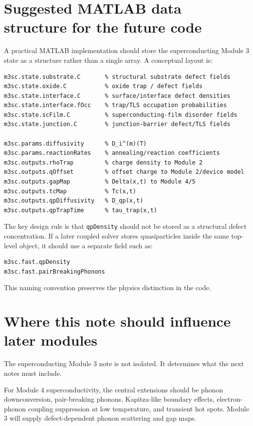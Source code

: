 \documentclass[11pt]{article}
\begin{document}
\section{Suggested MATLAB data structure for the future code}

A practical MATLAB implementation should store the superconducting Module 3 state as a structure rather than a single array. A conceptual layout is:
\begin{verbatim}
m3sc.state.substrate.C       % structural substrate defect fields
m3sc.state.oxide.C           % oxide trap / defect fields
m3sc.state.interface.C       % surface/interface defect densities
m3sc.state.interface.fOcc    % trap/TLS occupation probabilities
m3sc.state.scFilm.C          % superconducting-film disorder fields
m3sc.state.junction.C        % junction-barrier defect/TLS fields

m3sc.params.diffusivity      % D_i^(m)(T)
m3sc.params.reactionRates    % annealing/reaction coefficients
m3sc.outputs.rhoTrap         % charge density to Module 2
m3sc.outputs.qOffset         % offset charge to Module 2/device model
m3sc.outputs.gapMap          % Delta(x,t) to Module 4/5
m3sc.outputs.tcMap           % Tc(x,t)
m3sc.outputs.qpDiffusivity   % D_qp(x,t)
m3sc.outputs.qpTrapTime      % tau_trap(x,t)
\end{verbatim}
The key design rule is that \texttt{qpDensity} should not be stored as a structural defect concentration. If a later coupled solver stores quasiparticles inside the same top-level object, it should use a separate field such as:
\begin{verbatim}
m3sc.fast.qpDensity
m3sc.fast.pairBreakingPhonons
\end{verbatim}
This naming convention preserves the physics distinction in the code.

\section{Where this note should influence later modules}

The superconducting Module 3 note is not isolated. It determines what the next notes must include.

For Module 4 superconductivity, the central extensions should be phonon downconversion, pair-breaking phonons, Kapitza-like boundary effects, electron-phonon coupling suppression at low temperature, and transient hot spots. Module 3 will supply defect-dependent phonon scattering and gap maps.
\end{document}
